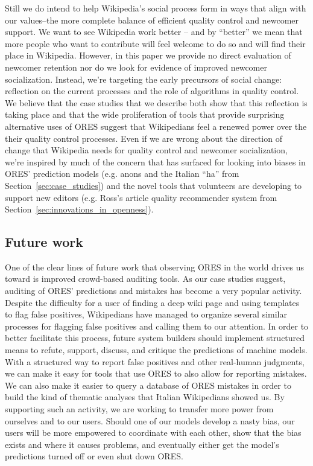 Still we do intend to help Wikipedia's social process form in ways that align with our values--the more complete balance of efficient quality control and newcomer support.  We want to see Wikipedia work better -- and by ``better'' we mean that more people who want to contribute will feel welcome to do so and will find their place in Wikipedia.  However, in this paper we provide no direct evaluation of newcomer retention nor do we look for evidence of improved newcomer socialization.  Instead, we're targeting the early precursors of social change: reflection on the current processes and the role of algorithms in quality control.  We believe that the case studies that we describe both show that this reflection is taking place and that the wide proliferation of tools that provide surprising alternative uses of ORES suggest that  Wikipedians feel a renewed power over the their quality control processes.  Even if we are wrong about the direction of change that Wikipedia needs for quality control and newcomer socialization, we're inspired by much of the concern that has surfaced for looking into biases in ORES' prediction models (e.g. anons and the Italian ``ha'' from Section~\ref{sec:case_studies}) and the novel tools that volunteers are developing to support new editors (e.g. Ross's article quality recommender system from Section~\ref{sec:innovations_in_openness}).

\subsection{Future work}
One of the clear lines of future work that observing ORES in the world drives us toward is improved crowd-based auditing tools.  As our case studies suggest, auditing of ORES' predictions and mistakes has become a very popular activity.  Despite the difficulty for a user of finding a deep wiki page and using templates to flag false positives, Wikipedians have managed to organize several similar processes for flagging false positives and calling them to our attention.  In order to better facilitate this process, future system builders should implement structured means to refute, support, discuss, and critique the predictions of machine models.  With a structured way to report false positives and other real-human judgments, we can make it easy for tools that use ORES to also allow for reporting mistakes.  We can also make it easier to query a database of ORES mistakes in order to build the kind of thematic analyses that Italian Wikipedians showed us.  By supporting such an activity, we are working to transfer more power from ourselves and to our users.  Should one of our models develop a nasty bias, our users will be more empowered to coordinate with each other, show that the bias exists and where it causes problems, and eventually either get the model's predictions turned off or even shut down ORES.

